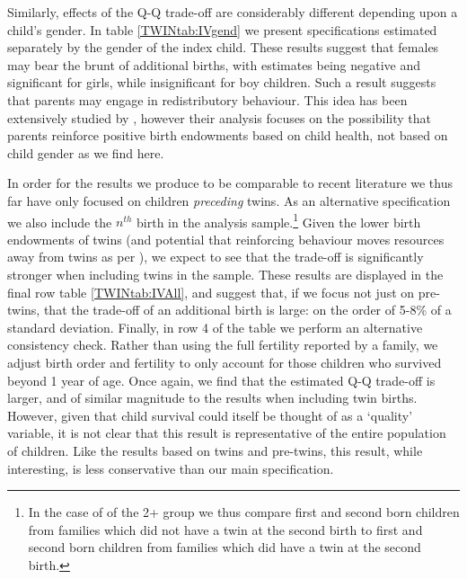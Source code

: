 Similarly, effects of the Q-Q trade-off are considerably different depending
upon a child's gender.  In table \ref{TWINtab:IVgend} we present specifications 
estimated separately by the gender of the index child.  These results suggest
that females may bear the brunt of additional births, with estimates being 
negative and significant for girls, while insignificant for boy children.  Such 
a result suggests that parents may engage in redistributory behaviour.  This 
idea has been extensively studied by \citet{RosenzweigZhang2009}, however their 
analysis focuses on the possibility that parents reinforce positive birth 
endowments based on child health, not based on child gender as we find here.

In order for the results we produce to be comparable to recent literature we
thus far have only focused on children \emph{preceding} twins.  As an 
alternative specification we also include the $n^{th}$ birth in the analysis
sample.\footnote{In the case of of the 2+ group we thus compare first and 
second born children from families which did not have a twin at the second
birth to first and second born children from families which did have a twin
at the second birth.}  Given the lower birth endowments of twins (and potential
that reinforcing behaviour moves resources away from twins as per 
\citet{RosenzweigZhang2009}), we expect to see that the trade-off is 
significantly stronger when including twins in the sample.  These results are 
displayed in the final row table \ref{TWINtab:IVAll}, and suggest that, if we 
focus not just on pre-twins, that the trade-off of an additional birth is large: 
on the order of 5-8\% of a standard deviation. Finally, in row 4 of the table
we perform an alternative consistency check.  Rather than using the full 
fertility reported by a family, we adjust birth order and fertility to only 
account for those children who survived beyond 1 year of age.  Once again, we 
find that the estimated Q-Q trade-off is larger, and of similar magnitude to 
the results when including twin births.  However, given that child survival 
could itself be thought of as a `quality' variable, it is not clear that this
result is representative of the entire population of children.  Like the results
based on twins and pre-twins, this result, while interesting, is less
conservative than our main specification.

